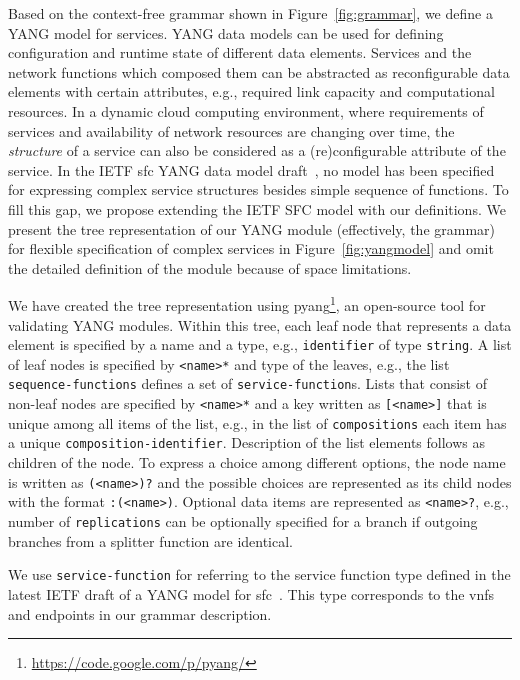 \documentclass{sig-alternate-per}
\begin{document}
Based on the context-free grammar shown in Figure~\ref{fig:grammar}, we 
define a YANG model for services. YANG data models can be used for defining 
configuration and runtime state of different data elements. Services and the network
functions which composed them can be abstracted as reconfigurable data elements with
certain attributes, e.g., required link capacity and computational resources. 
In a dynamic cloud computing environment, where requirements of services and
availability of network resources are changing over time, the \emph{structure} of a service 
can also be considered as a (re)configurable attribute of the service. 
In the IETF \ac{sfc} YANG data model draft~\cite{draft-penno-sfc-yang-11}, no model has been specified for 
expressing complex service structures besides simple sequence of functions.
To fill this gap, we propose extending the IETF SFC model with our definitions.
We present the tree representation of our YANG module (effectively, the grammar)
for flexible specification of complex services in Figure~\ref{fig:yangmodel} and 
omit the detailed definition of the module because of space limitations.

We have created the tree representation using pyang\footnote{\url{https://code.google.com/p/pyang/}}, an open-source tool for validating YANG
modules. Within this tree, each leaf node that represents a data element is specified by a name and a type, e.g., 
\texttt{identifier} of type \texttt{string}. A list of leaf nodes is
specified by \texttt{<name>*} and type of the leaves, e.g., the list \texttt{sequence-functions}
defines a set of \texttt{service-function}s. Lists that consist of non-leaf nodes
are specified by \texttt{<name>*} and a key written as \texttt{[<name>]} that is unique among all 
items of the list, e.g., in the list of \texttt{compositions} each item has a unique
\texttt{composition-identifier}. Description of the list elements follows as children
of the node. 
To express a choice among different options, the node name is written as
\texttt{(<name>)?} and the possible choices are represented as its child nodes 
with the format \texttt{:(<name>)}.
Optional data items are represented as \texttt{<name>?}, e.g., number of \texttt{replications}
can be optionally specified for a branch if outgoing branches from a splitter 
function are identical.

We use \texttt{service-function} for referring to the service function type defined
in the latest IETF draft of a YANG model for \ac{sfc}~\cite{draft-penno-sfc-yang-11}.
This type corresponds to the \acp{vnf} and endpoints in our grammar description.
\end{document}
